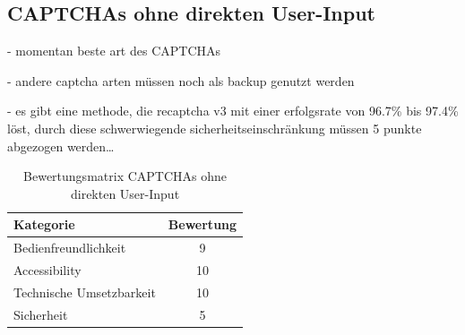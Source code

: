 \subsection{CAPTCHAs ohne direkten User-Input}

- momentan beste art des CAPTCHAs

- andere captcha arten müssen noch als backup genutzt werden 

- es gibt eine methode, die recaptcha v3 mit einer erfolgsrate von 96.7\% bis 97.4\% löst,
durch diese schwerwiegende sicherheitseinschränkung müssen 5 punkte abgezogen werden\dots
\cite{DBLP:journals/corr/abs-1903-01003}

\begin{table}[h!]
    \caption{Bewertungsmatrix CAPTCHAs ohne direkten User-Input}
    \begin{center}
        \begin{tabular}{l|c}
            Kategorie                       & Bewertung \\\hline
            Bedienfreundlichkeit            & 9         \\
            Accessibility                   & 10        \\
            Technische Umsetzbarkeit        & 10         \\
            Sicherheit                      & 5         
        \end{tabular}
    \end{center}
\end{table}